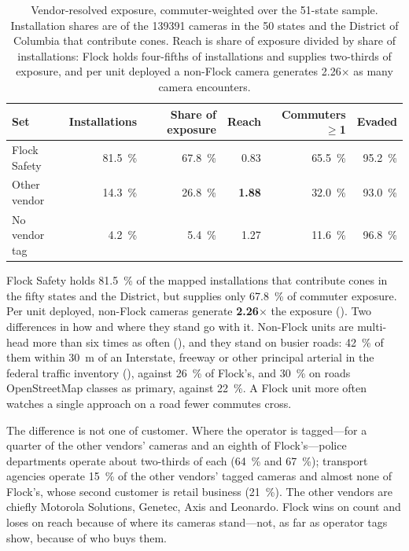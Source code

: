 \documentclass[11pt,twoside]{article}
\begin{document}
\begin{table}[tbp]
\centering
\small
\caption{Vendor-resolved exposure, commuter-weighted over the 51-state sample. Installation
shares are of the \num{139391} cameras in the 50 states and the District of Columbia that
contribute cones. Reach is share of exposure divided by share of installations: Flock holds
four-fifths of installations and supplies two-thirds of exposure, and per unit deployed a
non-Flock camera generates \num{2.26}$\times$ as many camera encounters.}
\label{tab:vendorexp}
\begin{tabular}{lrrrrr}
\toprule
Set & Installations & Share of exposure & Reach & Commuters $\geq$1 & Evaded \\
\midrule
Flock Safety  & \SI{81.5}{\percent} & \SI{67.8}{\percent} & \num{0.83} & \SI{65.5}{\percent} & \SI{95.2}{\percent} \\
Other vendor  & \SI{14.3}{\percent} & \SI{26.8}{\percent} & \textbf{\num{1.88}} & \SI{32.0}{\percent} & \SI{93.0}{\percent} \\
No vendor tag & \SI{4.2}{\percent}  & \SI{5.4}{\percent}  & \num{1.27} & \SI{11.6}{\percent} & \SI{96.8}{\percent} \\
\bottomrule
\end{tabular}
\end{table}

Flock Safety holds \SI{81.5}{\percent} of the mapped installations that contribute cones in the
fifty states and the District, but supplies only \SI{67.8}{\percent} of commuter exposure. Per
unit deployed, non-Flock cameras generate \textbf{\num{2.26}$\times$} the exposure
(). Two differences in how and where they stand go with it. Non-Flock
units are multi-head more than six times as often (), and they stand on
busier roads: \SI{42}{\percent} of them within \SI{30}{\metre} of an Interstate, freeway or other
principal arterial in the federal traffic inventory (), against
\SI{26}{\percent} of Flock's, and \SI{30}{\percent} on roads OpenStreetMap classes as primary,
against \SI{22}{\percent}. A Flock unit more often watches a single approach on a road fewer
commutes cross.

The difference is not one of customer. Where the operator is tagged---for a quarter of the
other vendors' cameras and an eighth of Flock's---police departments operate about two-thirds
of each (\SI{64}{\percent} and \SI{67}{\percent}); transport agencies operate \SI{15}{\percent} of
the other vendors' tagged cameras and almost none of Flock's, whose second customer is retail
business (\SI{21}{\percent}). The other vendors are chiefly Motorola Solutions, Genetec, Axis and
Leonardo. Flock wins on count and loses on reach because of where its cameras stand---not, as
far as operator tags show, because of who buys them.
\end{document}
